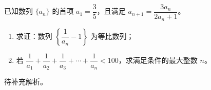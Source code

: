 \begin{prob}[source={选修二P41拓广探索}, topic={递推数列与等比数列}, score=12]
已知数列 $\{a_n\}$ 的首项 $a_1 = \dfrac{3}{5}$，且满足 $a_{n+1} = \dfrac{3a_n}{2a_n+1}$。
\begin{enumerate}
	\item[(1)] 求证：数列 $\left\{\dfrac{1}{a_n} - 1\right\}$ 为等比数列；
	\item[(2)] 若 $\dfrac{1}{a_1} + \dfrac{1}{a_2} + \dfrac{1}{a_3} + \cdots + \dfrac{1}{a_n} < 100$，求满足条件的最大整数 $n$。
\end{enumerate}
\end{prob}
\begin{prob-sol}
待补充解析。
\end{prob-sol}
